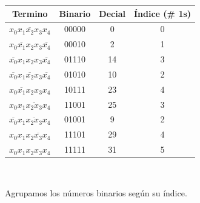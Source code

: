 \documentclass[a4paper,12pt]{article}
\begin{document}
\begin{enumerate}[label=\textcolor{teal}{\textbf{\arabic*.}}]
        \begin{center}
            \begin{table}[h]
            \centering
            \begin{tabular}{|c|c|c|c|}
                \hline
                Termino & Binario & Decial & Índice (\# 1s)\\ 
                \hline
                $\overline{x_0 x_1 x_2 x_3 x_4}$  & 00000 & 0 & 0 \\ 
                \hline 
                $\overline{x_0 x_1 x_2} x_3 \overline{x_4} $ & 00010 & 2 & 1 \\ 
                \hline 
                $\overline{x_0} x_1 x_2 x_3 \overline{x_4} $ & 01110 & 14 & 3 \\ 
                \hline 
                $ \overline{x_0} x_1 \overline{x_2} x_3 \overline{x_4}$ & 01010 & 10 & 2 \\ 
                \hline 
                $x_0 \overline{x_1} x_2 x_3 x_4$ & 10111 & 23 & 4 \\ 
                \hline 
                $x_0 x_1 \overline{ x_2 x_3} x_4 $ & 11001 & 25 & 3 \\ 
                \hline 
                $ \overline{x_0} x_1 \overline{ x_2 x_3} x_4 $ & 01001 & 9 & 2 \\
                \hline 
                $x_0 x_1 x_2 \overline{ x_3} x_4 $ & 11101 & 29 & 4 \\ 
                \hline
                $x_0 x_1 x_2 x_3 x_4 $ & 11111 & 31 & 5 \\ 
                \hline  
            \end{tabular}\\
        \end{table}
        \end{center}

        Agrupamos los números binarios según su índice.\\


\end{enumerate}
\end{document}
